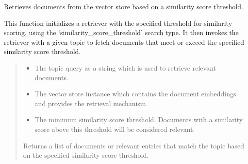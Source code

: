 \documentclass[letterpaper,10pt,english,openany,oneside]{sphinxmanual}
\begin{document}

\begin{fulllineitems}
\label{\detokenize{retriever:tools.pipeline.retrieve_documents}}
\pysigstartsignatures
{}
\pysigstopsignatures
\sphinxAtStartPar
Retrieves documents from the vector store based on a similarity score threshold.

\sphinxAtStartPar
This function initializes a retriever with the specified threshold for similarity scoring, using the ‘similarity\_score\_threshold’ search type.
It then invokes the retriever with a given topic to fetch documents that meet or exceed the specified similarity score threshold.
\begin{quote}\begin{description}
\begin{itemize}
\item {} 
\sphinxAtStartPar
{} \textendash{} The topic query as a string which is used to retrieve relevant documents.

\item {} 
\sphinxAtStartPar
{} \textendash{} The vector store instance which contains the document embeddings and provides the retrieval mechanism.

\item {} 
\sphinxAtStartPar
{} \textendash{} The minimum similarity score threshold. Documents with a similarity score above this threshold will be considered relevant.

\end{itemize}

\sphinxAtStartPar
Returns a list of documents or relevant entries that match the topic based on the specified similarity score threshold.

\end{description}\end{quote}

\end{fulllineitems}
\end{document}
